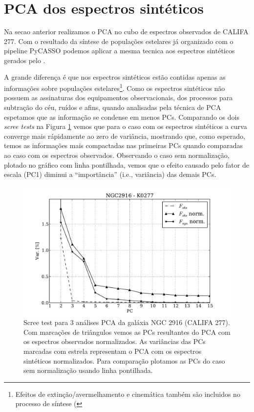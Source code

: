 \section{PCA dos espectros sintéticos}
\label{sec:PCAaplic:OBSxSYN}


Na secao anterior 
realizamos o PCA no cubo de
espectros observados de CALIFA 277.  Com o resultado da síntese de populações estelares já organizado com o pipeline PyCASSO podemos aplicar a mesma tecnica aos espectros sintéticos gerados pelo \starlight.

A grande diferença é que nos espectros sintéticos estão contidas
apenas as informações sobre populações estelares\footnote{Efeitos de extinção/avermelhamento e cinemática também são
incluidos no processo de síntese (\citep{CidFernandes2005}}. Como os espectros sintéticos
não possuem as assinaturas dos equipamentos observacionais, dos processos para subtração do céu, ruídos e afins, quando
analisadas pela técnica de PCA espetamos que as informação se condense em menos PCs. Comparando os dois {\em scree tests}
na Figura \ref{fig:PCAaplic:K0277scree} vemos que para o caso com os espectros sintéticos a curva converge mais rápidamente ao
zero de variância, mostrando que, como esperado, temos as informações mais compactadas nas primeiras PCs quando comparadas ao caso com
os espectros observados. Observando o caso sem normalização, plotado no gráfico com linha pontilhada, vemos que o efeito
causado pelo fator de escala (PC1) diminui a ``importância'' (i.e., variância) das demais PCs. 

\begin{figure}
    \includegraphics[width=1.\textwidth]{figuras/K0277-screetest.pdf}
    \caption[Scree test comparativo entre 3 PCAs.]
    {Scree test para 3 análises PCA da galáxia NGC 2916 (CALIFA 277). Com marcações de triângulos vemos as PCs
    resultantes do PCA com os espectros observados normalizados. As variâncias das PCs marcadas com estrela representam
    o PCA com os espectros sintéticos normalizados. Para comparação plotamos as PCs do caso sem normalização usando
    linha pontilhada.}
    \label{fig:PCAaplic:K0277scree}
\end{figure}


